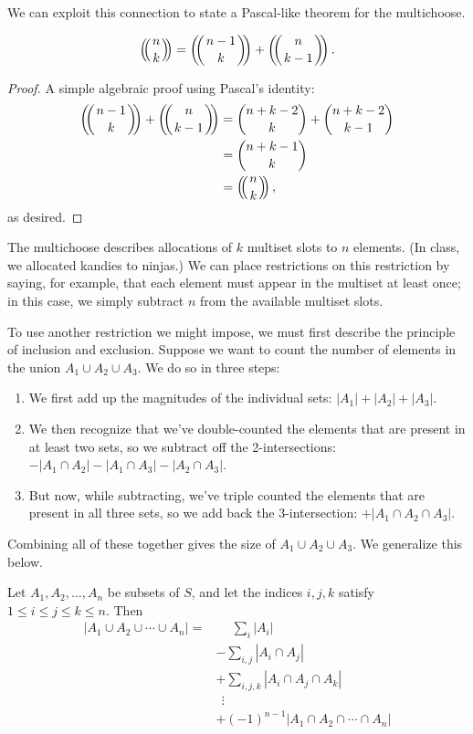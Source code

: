\documentclass[../m055main.tex]{subfiles}
\begin{document}
We can exploit this connection to state a Pascal-like theorem for the multichoose.

\begin{theorem}[]
    \[ \mchoose{n}{k} = \mchoose{n-1}{k} + \mchoose{n}{k-1}. \]
\end{theorem}

\begin{proof}
    A simple algebraic proof using Pascal's identity:
    \begin{align*}
        \mchoose{n-1}{k} + \mchoose{n}{k-1} &= \binom{n+k-2}{k} + \binom{n+k-2}{k-1} \\
        &= \binom{n+k-1}{k} \\
        &= \mchoose{n}{k},
    \end{align*}
    as desired.
\end{proof}

The multichoose describes allocations of $k$ multiset slots to $n$ elements.
(In class, we allocated kandies to ninjas.)
We can place restrictions on this restriction by saying, for example, that each element must appear in the multiset at least once; in this case, we simply subtract $n$ from the available multiset slots.

To use another restriction we might impose, we must first describe the principle of inclusion and exclusion.
Suppose we want to count the number of elements in the union $A_1 \cup A_2 \cup A_3$.
We do so in three steps:
\begin{enumerate}
    \item We first add up the magnitudes of the individual sets: $|A_1| + |A_2| + |A_3|$.
    \item We then recognize that we've double-counted the elements that are present in at least two sets, so we subtract off the 2-intersections: $- |A_1 \cap A_2| - |A_1 \cap A_3| - |A_2 \cap A_3|$.
    \item But now, while subtracting, we've triple counted the elements that are present in all three sets, so we add back the 3-intersection: $+ |A_1 \cap A_2 \cap A_3|$.
\end{enumerate}
Combining all of these together gives the size of $A_1 \cup A_2 \cup A_3$.
We generalize this below.

\begin{theorem}
    Let $A_1, A_2, \ldots, A_n$ be subsets of $S$, and let the indices $i,j,k$ satisfy $1 \leq i \leq j \leq k \leq n$.
    Then
    \begin{align*}
        |A_1 \cup A_2 \cup \cdots \cup A_n| =& \phantom{+}\sum_{i} |A_i| \\
        & - \sum_{i,j} |A_i \cap A_j| \\
        & + \sum_{i,j,k} |A_i \cap A_j \cap A_k| \\
        & \;\,\vdots \\
        & + (-1)^{n-1} |A_1 \cap A_2 \cap \cdots \cap A_n|
    \end{align*}
\end{theorem}
\end{document}
